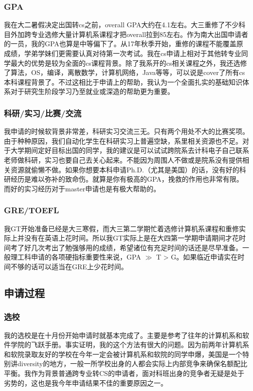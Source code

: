\documentclass[a4paper,UTF8]{book}
\begin{document}
        \subsubsection*{GPA}
        我在大二暑假决定出国转cs之前，overall GPA大约在4.1左右。大三重修了不少科目外加跨专业选修大量计算机系课程才把overall拉到85左右。作为南大出国申请者的一员，我的GPA也算是中等偏下了。从17年秋季开始，重修的课程不能覆盖原成绩，学弟学妹们更需要认真对待第一次考试。我在cs申请上相对于其他转专业同学最大的优势是较为全面的cs课程背景。除了我系开的cs相关课程之外，我还选修了算法，OS，编译，离散数学，计算机网络，Java等等，可以说是cover了所有cs本科课程背景了。不过这相比于申请上的帮助，我认为一个全面扎实的基础知识体系对于研究生阶段学习乃至就业或深造的帮助更为重要。

        \subsubsection*{科研/实习/比赛/交流}
        我申请的时候软背景非常差，科研实习交流三无。只有两个用处不大的比赛奖项。由于种种原因，我们自动化学生在科研实习上普遍空缺，系里相关资源也不足。对于大学期间定好目标出国的同学，我的建议是可以试试跨院系去计科电子自己联系老师做科研，实习也要自己去关心起来。不能因为周围人不做或是院系没有提供相关资源就偷懒不做。如果你想要本科申请Ph.D.（尤其是美国）的话，没有好的科研经历是难以弥补的致命伤。就算是你有极高的GPA，挽救的作用也非常有限。而好的实习经历对于master申请也是有极大帮助的。

        \subsubsection*{GRE/TOEFL}
        我GT开始准备已经是大三寒假，而大三第二学期忙着选修计算机系课程和重修实际上并没有在英语上花时间。所以我GT实际上是在大四第一学期申请期间才花时间考了好几次考出了勉强够用的成绩，希望诸位有充足时间的话还是尽早准备。一般理工科申请的各项硬指标重要性来说，GPA $\gg$ T > G。如果临近申请实在时间不够的话可以适当在GRE上少花时间。

    \subsection*{申请过程}
        \subsubsection*{选校}
        我的选校是在十月份开始申请时就基本完成了。主要是参考了往年的计算机系和软件学院的飞跃手册。事实证明，我的这个方法有很大的问题。因为前两年计算机系和软院录取友好的学校在今年一定会被计算机系和软院的同学申爆，美国是一个特别讲diversity的地方，一般一所学校出身的人都会实际上内部竞争来确保名额配比平衡。我作为背景普通跨专业转CS的申请者，面对科班出身的竞争者无疑是处于劣势的，这也是我今年申请结果不佳的重要原因之一。
\end{document}
